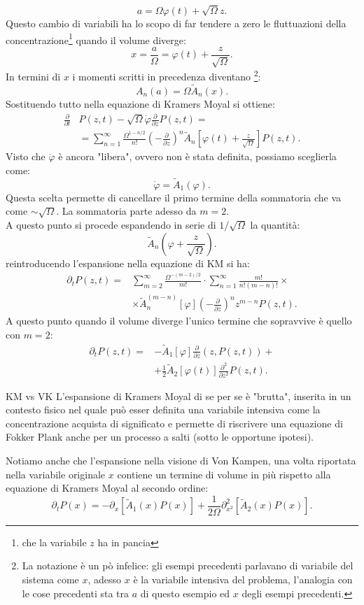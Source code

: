 \[
    a = \Omega\varphi (t) + \sqrt{\Omega} z
.\] 
Questo cambio di variabili ha lo scopo di far tendere a zero le fluttuazioni della concentrazione\footnote{che la variabile $z$ ha in pancia} quando il volume diverge:
\[
    x = \frac{a}{\Omega} = \varphi(t) + \frac{z}{\sqrt{\Omega}}
.\] 
In termini di $x$ i momenti scritti in precedenza diventano
\footnote{La notazione è un pò infelice: gli esempi precedenti parlavano di variabile del sistema come $x$, adesso $x$ è la variabile intensiva del problema, l'analogia con le cose precedenti sta tra $a$ di questo esempio ed $x$ degli esempi precedenti.}:
\[
    A_n(a)  = \Omega \tilde{A}_n(x) 
.\] 
Sostituendo tutto nella equazione di Kramers Moyal si ottiene: 
\[\begin{aligned}
    \frac{\partial }{\partial t} &P(z, t) - \sqrt{\Omega} \dot{\varphi}\frac{\partial }{\partial z} P(z,t) = \\
					  &= \sum_{n=1}^{\infty} \frac{\Omega^{1-n /2}}{n!} \left(-\frac{\partial }{\partial z}\right)^n \tilde{A}_n
					  \left[\varphi (t) + \frac{z}{\sqrt{\Omega} }\right]P(z, t)
.\end{aligned}\]
Visto che $\dot{\varphi}$ è ancora "libera", ovvero non è stata definita, possiamo sceglierla come:
\[
    \dot{\varphi  } = \tilde{A}_1(\varphi) 
.\] 
Questa scelta permette di cancellare il primo termine della sommatoria che va come $\sim \sqrt{\Omega} $. La sommatoria parte adesso da $m=2$.\\
A questo punto si procede espandendo in serie di $1 /\sqrt{\Omega} $  la quantità:
\[
    \tilde{A}_n (\varphi + \frac{z}{\sqrt{\Omega}})
.\] 
reintroducendo l'espansione nella equazione di KM si ha:
\[\begin{aligned}
    \partial_{t}P(z,t) = & \sum_{m=2}^{\infty} \frac{\Omega^{-(m-2) /2}}{m!} \cdot \sum_{n=1}^{\infty} \frac{m!}{n!(m-n)!} \times \\
			 &\times \tilde{A}_n^{(m-n)}\left[\varphi\right]\left(-\frac{\partial }{\partial z}\right)^nz^{m-n}P(z,t) 
.\end{aligned}\]
A questo punto quando il volume diverge l'unico termine che sopravvive è quello con $m = 2$:
\[\begin{aligned}
    \partial_{t}P(z,t) =& - \tilde{A}_1\left[\varphi\right] \frac{\partial }{\partial z} (z,P(z,t)) +\\
		       & + \frac{1}{2}\tilde{A}_2\left[\varphi (t) \right] \frac{\partial ^2}{\partial z^2} P(z,t) 
.\end{aligned}\]
\begin{redbox}{KM vs VK}
    L'espansione di Kramers Moyal di se per se è "brutta", inserita in un contesto fisico nel quale può esser definita una variabile intensiva come la concentrazione acquista di significato e permette di riscrivere una equazione di Fokker Plank anche per un processo a salti (sotto le opportune ipotesi).
\end{redbox}
\noindent
Notiamo anche che l'espansione nella visione di Von Kampen, una volta riportata nella variabile originale $x$ contiene un termine di volume in più rispetto alla equazione di Kramers Moyal al secondo ordine:
\[
    \partial_{t}P(x) = - \partial_{x} \left[\tilde{A}_1(x) P(x) \right] + \frac{1}{2\Omega} \partial^2_{x^2} \left[\tilde{A}_2(x) P(x)\right]
.\] 
